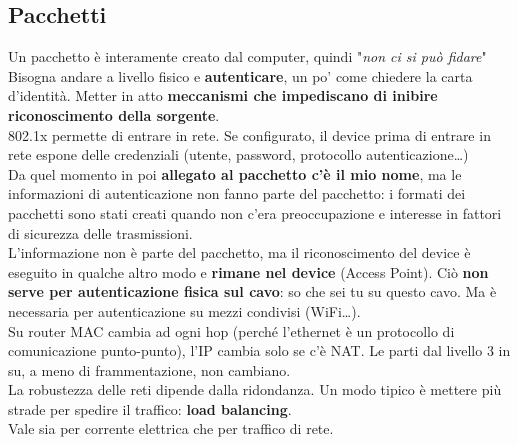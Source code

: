 \documentclass[10pt]{book}
\begin{document}
\subsection{Pacchetti}
Un pacchetto è interamente creato dal computer, quindi "\textit{non ci si può fidare}"\\
Bisogna andare a livello fisico e \textbf{autenticare}, un po' come chiedere la carta d'identità. Metter in atto \textbf{meccanismi che impediscano di inibire riconoscimento della sorgente}.\\
802.1x permette di entrare in rete. Se configurato, il device prima di entrare in rete espone delle credenziali (utente, password, protocollo autenticazione\ldots)\\
Da quel momento in poi \textbf{allegato al pacchetto c'è il mio nome}, ma le informazioni di autenticazione non fanno parte del pacchetto: i formati dei pacchetti sono stati creati quando non c'era preoccupazione e interesse in fattori di sicurezza delle trasmissioni.\\
L'informazione non è parte del pacchetto, ma il riconoscimento del device è eseguito in qualche altro modo e \textbf{rimane nel device} (Access Point). Ciò \textbf{non serve per autenticazione fisica sul cavo}: so che sei tu su questo cavo. Ma è necessaria per autenticazione su mezzi condivisi (WiFi\ldots).\\
Su router MAC cambia ad ogni hop (perché l'ethernet è un protocollo di comunicazione punto-punto), l'IP cambia solo se c'è NAT. Le parti dal livello 3 in su, a meno di frammentazione, non cambiano.\\
La robustezza delle reti dipende dalla ridondanza. Un modo tipico è mettere più strade per spedire il traffico: \textbf{load balancing}.\\
Vale sia per corrente elettrica che per traffico di rete.
\end{document}
